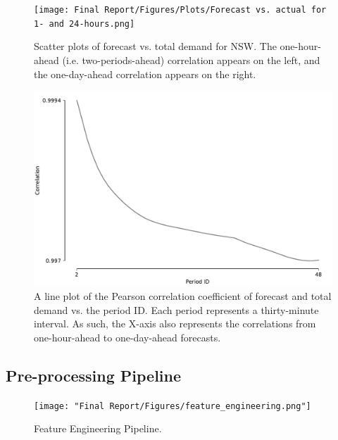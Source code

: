 \documentclass[mstat,12pt]{unswthesis}
\begin{document}
\begin{figure}[H]
\centerline{\texttt{[image: Final Report/Figures/Plots/Forecast vs. actual for 1- and 24-hours.png]}}
\caption{Scatter plots of forecast vs. total demand for NSW. The one-hour-ahead (i.e. two-periods-ahead) correlation appears on the left, and the one-day-ahead correlation appears on the right.}
\label{fdemand_vs_tdemand}
\end{figure}

\begin{figure}[H]
\centerline{\includegraphics[width=0.8\columnwidth]{Final Report/Figures/Plots/Forecast vs. actual correlation by Period ID.pdf}}
\caption{A line plot of the Pearson correlation coefficient of forecast and total demand vs. the period ID. Each period represents a thirty-minute interval. As such, the X-axis also represents the correlations from one-hour-ahead to one-day-ahead forecasts.}
\label{corr_by_per}
\end{figure}

\begin{landscape}
\hypertarget{appendix-preprocessing-pipeline}{\section{Pre-processing Pipeline}\label{appendix-preprocessing-pipeline}}

\begin{figure}[H]
    \centering
    \texttt{[image: "Final Report/Figures/feature\_engineering.png"]}
    \caption{Feature Engineering Pipeline.}
    \label{feature-engineering-process}
\end{figure}

\end{landscape}
\end{document}
